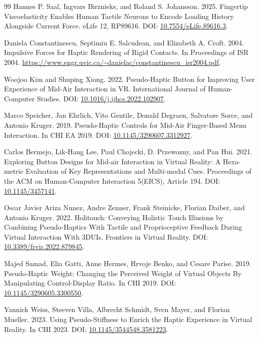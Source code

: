 \documentclass[11pt]{article}
\begin{document}
\begin{thebibliography}{99}
Hannes P. Saal, Ingvars Birznieks, and Roland S. Johansson. 2025. Fingertip Viscoelasticity Enables Human Tactile Neurons to Encode Loading History Alongside Current Force. eLife 12, RP89616. DOI: \href{https://doi.org/10.7554/eLife.89616.3}{10.7554/eLife.89616.3}.

Daniela Constantinescu, Septimiu E. Salcudean, and Elizabeth A. Croft. 2004. Impulsive Forces for Haptic Rendering of Rigid Contacts. In Proceedings of ISR 2004. \url{https://www.engr.uvic.ca/~danielac/constantinescu_isr2004.pdf}.

Woojoo Kim and Shuping Xiong. 2022. Pseudo-Haptic Button for Improving User Experience of Mid-Air Interaction in VR. International Journal of Human-Computer Studies. DOI: \href{https://doi.org/10.1016/j.ijhcs.2022.102907}{10.1016/j.ijhcs.2022.102907}.

Marco Speicher, Jan Ehrlich, Vito Gentile, Donald Degraen, Salvatore Sorce, and Antonio Kruger. 2019. Pseudo-Haptic Controls for Mid-Air Finger-Based Menu Interaction. In CHI EA 2019. DOI: \href{https://doi.org/10.1145/3290607.3312927}{10.1145/3290607.3312927}.

Carlos Bermejo, Lik-Hang Lee, Paul Chojecki, D. Przewozny, and Pan Hui. 2021. Exploring Button Designs for Mid-air Interaction in Virtual Reality: A Hexa-metric Evaluation of Key Representations and Multi-modal Cues. Proceedings of the ACM on Human-Computer Interaction 5(EICS), Article 194. DOI: \href{https://doi.org/10.1145/3457141}{10.1145/3457141}.

Oscar Javier Ariza Nunez, Andre Zenner, Frank Steinicke, Florian Daiber, and Antonio Kruger. 2022. Holitouch: Conveying Holistic Touch Illusions by Combining Pseudo-Haptics With Tactile and Proprioceptive Feedback During Virtual Interaction With 3DUIs. Frontiers in Virtual Reality. DOI: \href{https://doi.org/10.3389/frvir.2022.879845}{10.3389/frvir.2022.879845}.

Majed Samad, Elia Gatti, Anne Hermes, Hrvoje Benko, and Cesare Parise. 2019. Pseudo-Haptic Weight: Changing the Perceived Weight of Virtual Objects By Manipulating Control-Display Ratio. In CHI 2019. DOI: \href{https://doi.org/10.1145/3290605.3300550}{10.1145/3290605.3300550}.

Yannick Weiss, Steeven Villa, Albrecht Schmidt, Sven Mayer, and Florian Mueller. 2023. Using Pseudo-Stiffness to Enrich the Haptic Experience in Virtual Reality. In CHI 2023. DOI: \href{https://doi.org/10.1145/3544548.3581223}{10.1145/3544548.3581223}.


\end{thebibliography}
\end{document}
